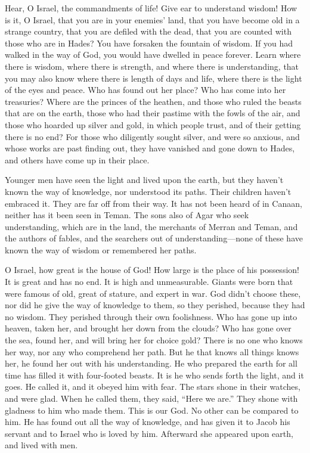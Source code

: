  Hear, O Israel, the commandments of life! Give ear to
understand wisdom!  How is it, O Israel, that you are in
your enemies' land, that you have become old in a strange country, that
you are defiled with the dead,  that you are counted with
those who are in Hades?  You have forsaken the fountain
of wisdom.  If you had walked in the way of God, you
would have dwelled in peace forever.  Learn where there
is wisdom, where there is strength, and where there is understanding,
that you may also know where there is length of days and life, where
there is the light of the eyes and peace.  Who has found
out her place? Who has come into her treasuries?  Where
are the princes of the heathen, and those who ruled the beasts that are
on the earth,  those who had their pastime with the fowls
of the air, and those who hoarded up silver and gold, in which people
trust, and of their getting there is no end?  For those
who diligently sought silver, and were so anxious, and whose works are
past finding out,  they have vanished and gone down to
Hades, and others have come up in their place.

 Younger men have seen the light and lived upon the
earth, but they haven't known the way of knowledge,  nor
understood its paths. Their children haven't embraced it. They are far
off from their way.  It has not been heard of in Canaan,
neither has it been seen in Teman.  The sons also of Agar
who seek understanding, which are in the land, the merchants of Merran
and Teman, and the authors of fables, and the searchers out of
understanding---none of these have known the way of wisdom or remembered
her paths.

 O Israel, how great is the house of God! How large is
the place of his possession!  It is great and has no end.
It is high and unmeasurable.  Giants were born that were
famous of old, great of stature, and expert in war.  God
didn't choose these, nor did he give the way of knowledge to them,
 so they perished, because they had no wisdom. They
perished through their own foolishness.  Who has gone up
into heaven, taken her, and brought her down from the clouds?
 Who has gone over the sea, found her, and will bring her
for choice gold?  There is no one who knows her way, nor
any who comprehend her path.  But he that knows all
things knows her, he found her out with his understanding. He who
prepared the earth for all time has filled it with four-footed beasts.
 It is he who sends forth the light, and it goes. He
called it, and it obeyed him with fear.  The stars shone
in their watches, and were glad. When he called them, they said, ``Here
we are.'' They shone with gladness to him who made them. 
This is our God. No other can be compared to him.  He has
found out all the way of knowledge, and has given it to Jacob his
servant and to Israel who is loved by him.  Afterward she
appeared upon earth, and lived with men.

